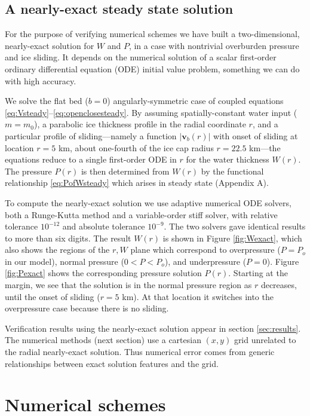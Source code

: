 \documentclass[gmd]{copernicus}   %
\newcommand\bv{\mathbf{v}}
\begin{document}
\subsection{A nearly-exact steady state solution}  \label{subsec:exactsolution}  For the purpose of verifying numerical schemes we have built a two-dimensional, nearly-exact solution for $W$ and $P$, in a case with nontrivial overburden pressure and ice sliding.  It depends on the numerical solution of a scalar first-order ordinary differential equation (ODE) initial value problem, something we can do with high accuracy.

We solve the flat bed ($b=0$) angularly-symmetric case of coupled equations \eqref{eq:Vsteady}--\eqref{eq:openclosesteady}.  By assuming spatially-constant water input ($m=m_0$), a parabolic ice thickness profile in the radial coordinate $r$, and a particular profile of sliding---namely a function $|\bv_b(r)|$ with onset of sliding at location $r=5$ km, about one-fourth of the ice cap radius $r=22.5$ km---the equations reduce to a single first-order ODE in $r$ for the water thickness $W(r)$.  The pressure $P(r)$ is then determined from $W(r)$ by the functional relationship \eqref{eq:PofWsteady} which arises in steady state (Appendix A).

To compute the nearly-exact solution we use adaptive numerical ODE solvers, both a Runge-Kutta method and a variable-order stiff solver, with relative tolerance $10^{-12}$ and absolute tolerance $10^{-9}$.  The two solvers gave identical results to more than six digits.  The result $W(r)$ is shown in Figure \ref{fig:Wexact}, which also shows the regions of the $r,W$ plane which correspond to overpressure ($P=P_o$ in our model), normal pressure ($0<P<P_o$), and underpressure ($P=0$).  Figure \ref{fig:Pexact} shows the corresponding pressure solution $P(r)$.  Starting at the margin, we see that the solution is in the normal pressure region as $r$ decreases, until the onset of sliding ($r=5$ km).  At that location it switches into the overpressure case because there is no sliding.

Verification results using the nearly-exact solution appear in section \ref{sec:results}.  The numerical methods (next section) use a cartesian $(x,y)$ grid unrelated to the radial nearly-exact solution.  Thus numerical error comes from generic relationships between exact solution features and the grid.


\section{Numerical schemes}  \label{sec:num}
\end{document}
